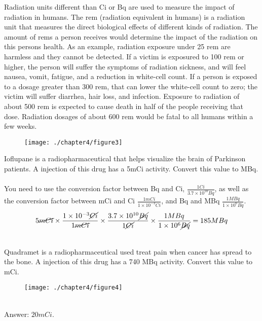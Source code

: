 \documentclass[main.tex]{subfiles}
\begin{document}
\begin{description}
Radiation units different than Ci or Bq are used to measure the impact of radiation in humans. The rem (radiation equivalent in humans) is a radiation unit that measures the direct biological effects of different kinds of radiation. The amount of rems a person receives would determine the impact of the radiation on this person\textquotesingle s health. As an example, radiation exposure under 25 rem are harmless and they cannot be detected. If a victim is exposured to 100 rem or higher, the person will suffer the symptoms of radiation sickness, and will feel nausea, vomit, fatigue, and a reduction in white-cell count. If a person is exposed to a dosage greater than 300 rem, that can lower the white-cell count to zero; the victim will suffer diarrhea, hair loss, and infection. Exposure to radiation of about 500 rem is expected to cause death in half of the people receiving that dose. Radiation dosages of about 600 rem would be fatal to all humans within a few weeks.


\begin{example} %
\begin{wrapfigure}{l}{0.07\textwidth}
    \centering
    \texttt{[image: ./chapter4/figure3]}
\end{wrapfigure}
Ioflupane is a radiopharmaceutical that helps visualize the brain of Parkinson patients. A injection of this drug has a 5mCi activity. Convert this value to MBq.
\\
\\
You need to use the conversion factor between Bq and Ci, $ \frac{1 Ci}{3.7 \times10^{10} Bq} $, as well as the conversion factor between mCi and Ci $ \frac{1 mCi}{1 \times10^{-3} Ci} $, and Bq and MBq $ \frac{1 MBq}{1 \times10^{6} Bq} $.
 \begin{equation*}
5\cancel{mCi} \times \dfrac{1 \times10^{-3}\cancel{Ci}}{1\cancel{mCi}} \times \dfrac{3.7 \times10^{10}\cancel{Bq}}{1\cancel{Ci}}  \times \dfrac{1MBq}{1 \times10^{6}\cancel{Bq}}  =185 MBq
\end{equation*}


\faDiamond\ \\

Quadramet is a radiopharmaceutical used treat pain when cancer has spread to the bone. A injection of this drug has a 740 MBq activity. Convert this value to mCi.
\begin{wrapfigure}{l}{0.03\textwidth}
    \centering\texttt{[image: ./chapter4/figure4]}
\end{wrapfigure} \\
\flushright Answer: $20mCi$.
\end{example}%
\end{description}
\end{document}
